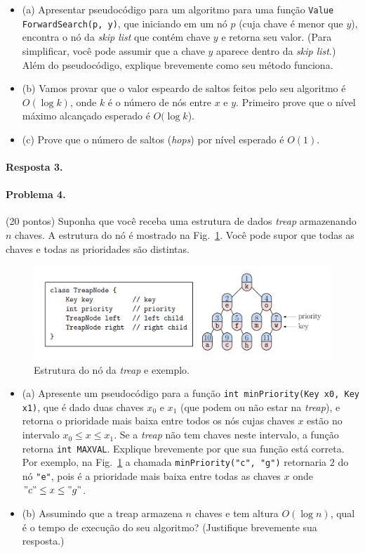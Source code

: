 \documentclass{article}
\begin{document}
\begin{itemize}
    \item (a) Apresentar pseudocódigo para um algoritmo para uma função \texttt{Value ForwardSearch(p, y)}, que iniciando em um nó $p$ (cuja chave é menor que $y$), encontra o nó da \textit{skip list} que contém chave $y$ e retorna seu valor. (Para simplificar, você pode assumir que a chave $y$ aparece dentro da \textit{skip list}.) Além do pseudocódigo, explique brevemente como seu método funciona.
    \item (b) Vamos provar que o valor espeardo de saltos feitos pelo seu algoritmo é $O(\log k)$, onde $k$ é o
número de nós entre $x$ e $y$. Primeiro prove que o nível máximo alcançado esperado é $O(\log k$).
    \item (c) Prove que o número de saltos (\textit{hops}) por nível esperado é $O(1)$.
\end{itemize}

\paragraph{Resposta 3.}

\paragraph{Problema 4.} (20 pontos)
Suponha que você receba uma estrutura de dados \textit{treap} armazenando $n$ chaves. A estrutura do nó
é mostrado na Fig.~\ref{fig:prob4}. Você pode supor que todas as chaves e todas as prioridades são distintas.

\begin{figure}[h]
    \centering
    \includegraphics[width = 0.8\linewidth]{figs/fig2.png}
    \caption{Estrutura do nó da \textit{treap} e exemplo.}
    \label{fig:prob4}
\end{figure}

\begin{itemize}
    \item (a) Apresente um pseudocódigo para a função \texttt{int minPriority(Key x0, Key x1)}, que é dado duas chaves $x_0$ e $x_1$ (que podem ou não estar na \textit{treap}), e retorna o
prioridade mais baixa entre todos os nós cujas chaves $x$ estão no intervalo $x_0 \leq x \leq x_1$. Se a \textit{treap}
não tem chaves neste intervalo, a função retorna \texttt{int MAXVAL}. Explique brevemente por que
sua função está correta. Por exemplo, na Fig.~\ref{fig:prob4} a chamada \texttt{minPriority("c", "g")} retornaria $2$ do nó
\texttt{"e"}, pois é a prioridade mais baixa entre todas as chaves $x$ onde $"c" \leq x \leq "g"$.
\item (b) Assumindo que a treap armazena $n$ chaves e tem altura $O(\log n)$, qual é o tempo de execução
do seu algoritmo? (Justifique brevemente sua resposta.)
\end{itemize}
\end{document}
